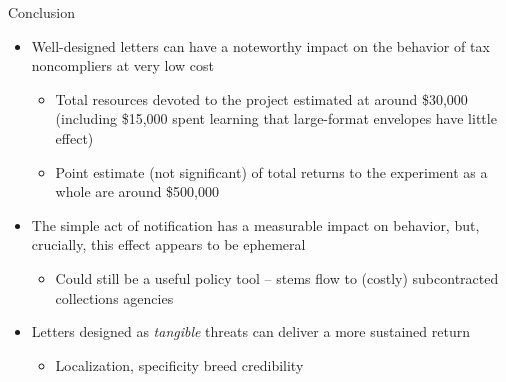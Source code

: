 \documentclass[ignorenonframetext,]{beamer}
\providecommand{\tightlist}{%
  \setlength{\itemsep}{0pt}\setlength{\parskip}{0pt}}
\begin{document}
\begin{frame}{Conclusion}

\begin{itemize}
\item
  Well-designed letters can have a noteworthy impact on the behavior of
  tax noncompliers at very low cost

  \begin{itemize}
  \item
    Total resources devoted to the project estimated at around \$30,000
    (including \$15,000 spent learning that large-format envelopes have
    little effect)
  \item
    Point estimate (not significant) of total returns to the experiment
    as a whole are around \$500,000
  \end{itemize}
\item
  The simple act of notification has a measurable impact on behavior,
  but, crucially, this effect appears to be ephemeral

  \begin{itemize}
  \tightlist
  \item
    Could still be a useful policy tool -- stems flow to (costly)
    subcontracted collections agencies
  \end{itemize}
\item
  Letters designed as \emph{tangible} threats can deliver a more
  sustained return

  \begin{itemize}
  \tightlist
  \item
    Localization, specificity breed credibility
  \end{itemize}
\end{itemize}

\end{frame}
\end{document}
